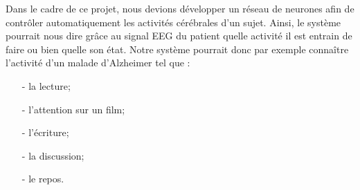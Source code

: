 	   Dans le cadre de ce projet, nous devions développer un réseau de neurones afin de contrôler 
	   automatiquement les activités cérébrales d'un sujet. Ainsi, le système pourrait nous dire grâce au signal EEG
	    du patient quelle activité il est entrain de faire ou bien quelle son état. 
	   Notre système pourrait donc par exemple connaître l'activité d'un malade d'Alzheimer tel que : 
	   \begin{itemize}
	   	\item[-] la lecture;
		\item[-] l'attention sur un film;
		\item[-] l'écriture;
		\item[-] la discussion;
		\item[-] le repos.
	   \end{itemize}
	
	
	
	

